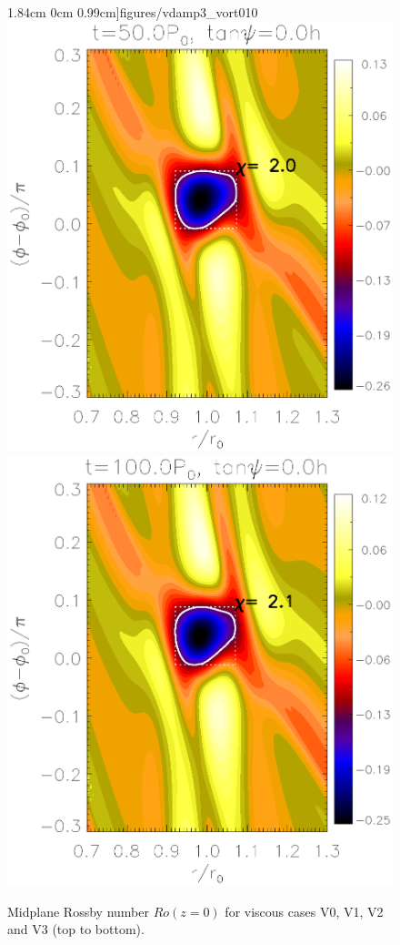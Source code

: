 \begin{figure}
     1.84cm 0cm
     0.99cm]{figures/vdamp3_vort010} \\
   \includegraphics[scale=.39,clip=true,trim=0cm 0cm 0cm
     0.99cm]{figures/vdamp0_nu4_vort005}\includegraphics[scale=.39,clip=true,trim=2.3cm
     0.0cm 0cm
     0.99cm]{figures/vdamp0_nu4_vort010}
   \caption{Midplane Rossby number
     $Ro(z=0)$ for viscous cases V0, V1, V2 and V3 (top to
     bottom). 
     \label{vdamp0_vort}}
\end{figure}

